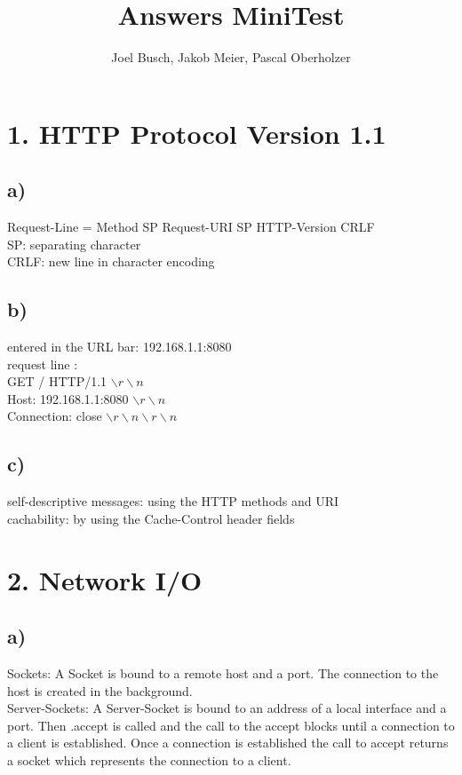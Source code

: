 \documentclass[10pt,a4paper]{article}
\title{Answers MiniTest}
\author{Joel Busch, Jakob Meier, Pascal Oberholzer}
\begin{document}
	\maketitle
	
	\section*{1. HTTP Protocol Version 1.1}
		\subsection*{a)}
			Request-Line = Method SP Request-URI SP HTTP-Version CRLF \\
			SP: separating character \\
			CRLF: new line in character encoding \\
		
		\subsection*{b)}
			entered in the URL bar: 192.168.1.1:8080 \\
			request line : \\
			\hspace*{5mm}GET / HTTP/1.1 $\backslash r \backslash n$\\
			\hspace*{5mm}Host: 192.168.1.1:8080 $\backslash r \backslash n$\\
			\hspace*{5mm}Connection: close $\backslash r \backslash n \backslash r \backslash n$\\
		
		\subsection*{c)}
			self-descriptive messages: using the HTTP methods and URI\\
			cachability: by using the Cache-Control header fields\\
		
	
	\section*{2. Network I/O}
		\subsection*{a)}
			Sockets: A Socket is bound to a remote host and a port. The connection to the host is created in the background.\\
			Server-Sockets: A Server-Socket is bound to an address of a local interface and a port. Then .accept is called and the call to the accept blocks until a connection to a client is established. Once a connection is established the call to accept returns a socket which represents the connection to a client.\\
		
\end{document}
